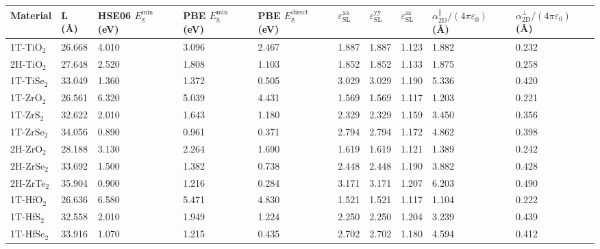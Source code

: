 % 

\begin{center}
  \footnotesize
  \setlongtables
  \begin{tabularx}{1.1\linewidth}{lXXXXXXXXX}
      \caption{Raw data of the materials calculated in this study.}\\
    \hline
    Material & L (\AA) & HSE06 $E_{\mathrm{g}}^{\mathrm{min}}$ (eV) & PBE $E_{\mathrm{g}}^{\mathrm{min}}$ (eV) & PBE $E_{\mathrm{g}}^{\mathrm{direct}}$ (eV) & $\varepsilon_{\mathrm{SL}}^{\mathrm{xx}}$ & $\varepsilon_{\mathrm{SL}}^{\mathrm{yy}}$ & $\varepsilon_{\mathrm{SL}}^{\mathrm{zz}}$ & $\alpha_{\mathrm{2D}}^{\parallel}/(4\pi \varepsilon_{0})$ (\AA) & $\alpha_{\mathrm{2D}}^{\perp}/(4\pi \varepsilon_{0})$ (\AA)\\
    \hline
    \endhead
    1T-TiO$_{2}$ & 26.668  & 4.010  & 3.096  & 2.467  & 1.887  & 1.887  & 1.123  & 1.882  & 0.232 \\
    2H-TiO$_{2}$ & 27.648  & 2.520  & 1.808  & 1.103  & 1.852  & 1.852  & 1.133  & 1.875  & 0.258 \\
    1T-TiSe$_{2}$ & 33.049  & 1.360  & 1.372  & 0.505  & 3.029  & 3.029  & 1.190  & 5.336  & 0.420 \\
    1T-ZrO$_{2}$ & 26.561  & 6.320  & 5.039  & 4.431  & 1.569  & 1.569  & 1.117  & 1.203  & 0.221 \\
    1T-ZrS$_{2}$ & 32.622  & 2.010  & 1.643  & 1.180  & 2.329  & 2.329  & 1.159  & 3.450  & 0.356 \\
    1T-ZrSe$_{2}$ & 34.056  & 0.890  & 0.961  & 0.371  & 2.794  & 2.794  & 1.172  & 4.862  & 0.398 \\
    2H-ZrO$_{2}$ & 28.188  & 3.130  & 2.264  & 1.690  & 1.619  & 1.619  & 1.121  & 1.389  & 0.242 \\
    2H-ZrSe$_{2}$ & 33.692  & 1.500  & 1.382  & 0.738  & 2.448  & 2.448  & 1.190  & 3.882  & 0.428 \\
    2H-ZrTe$_{2}$ & 35.904  & 0.900  & 1.216  & 0.284  & 3.171  & 3.171  & 1.207  & 6.203  & 0.490 \\
    1T-HfO$_{2}$ & 26.636  & 6.580  & 5.471  & 4.830  & 1.521  & 1.521  & 1.117  & 1.104  & 0.222 \\
    1T-HfS$_{2}$ & 32.558  & 2.010  & 1.949  & 1.224  & 2.250  & 2.250  & 1.204  & 3.239  & 0.439 \\
    1T-HfSe$_{2}$ & 33.916  & 1.070  & 1.215  & 0.435  & 2.702  & 2.702  & 1.180  & 4.594  & 0.412 \\

\end{tabularx}
\end{center}
